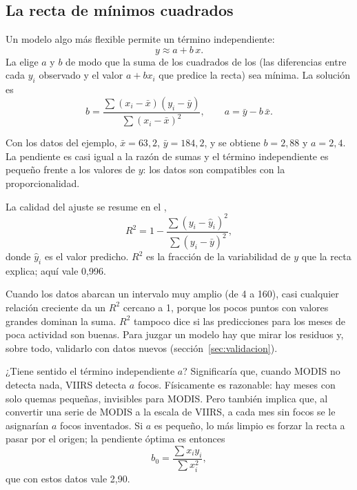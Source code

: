 \subsection{La recta de mínimos cuadrados}

Un modelo algo más flexible permite un término independiente:
\begin{equation}
  y \approx a + b\,x .
\end{equation}
La  elige $a$ y $b$ de modo que la suma de los
cuadrados de los  (las diferencias entre cada $y_i$ observado y el valor
$a + b x_i$ que predice la recta) sea mínima. La solución es
\begin{equation}\label{eq:mco}
  b = \frac{\sum (x_i - \bar{x})(y_i - \bar{y})}{\sum (x_i - \bar{x})^2},
  \qquad
  a = \bar{y} - b\,\bar{x} .
\end{equation}

Con los datos del ejemplo, $\bar{x} = 63{,}2$, $\bar{y} = 184{,}2$, y se obtiene $b = 2{,}88$ y
$a = 2{,}4$. La pendiente es casi igual a la razón de sumas y el término independiente es
pequeño frente a los valores de $y$: los datos son compatibles con la proporcionalidad.

La calidad del ajuste se resume en el ,
\begin{equation}
  R^2 = 1 - \frac{\sum (y_i - \hat{y}_i)^2}{\sum (y_i - \bar{y})^2},
\end{equation}
donde $\hat{y}_i$ es el valor predicho. $R^2$ es la fracción de la variabilidad de $y$ que la
recta explica; aquí vale 0,996.

\begin{atencion}
Cuando los datos abarcan un intervalo muy amplio (de 4 a 160), casi cualquier relación creciente
da un $R^2$ cercano a 1, porque los pocos puntos con valores grandes dominan la suma. $R^2$
tampoco dice si las predicciones para los meses de poca actividad son buenas. Para juzgar un
modelo hay que mirar los residuos y, sobre todo, validarlo con datos nuevos
(sección~\ref{sec:validacion}).
\end{atencion}

¿Tiene sentido el término independiente $a$? Significaría que, cuando MODIS no detecta nada,
VIIRS detecta $a$ focos. Físicamente es razonable: hay meses con solo quemas pequeñas, invisibles
para MODIS. Pero también implica que, al convertir una serie de MODIS a la escala de VIIRS, a
cada mes sin focos se le asignarían $a$ focos inventados. Si $a$ es pequeño, lo más limpio es
forzar la recta a pasar por el origen; la pendiente óptima es entonces
\begin{equation}
  b_0 = \frac{\sum x_i y_i}{\sum x_i^2},
\end{equation}
que con estos datos vale 2,90.

